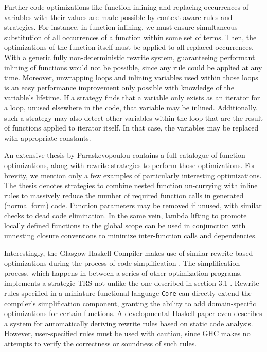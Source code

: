 \documentclass{article}
\begin{document}
Further code optimizations like function inlining and replacing occurrences of variables with their values
are made possible by context-aware rules and strategies. For instance, in function inlining, we must ensure
simultaneous substitution of all occurrences of a function within some set of terms.
Then, the optimizations of the function itself must be applied to all replaced occurrences.
With a generic fully non-deterministic rewrite system, guaranteeing performant inlining of functions would
not be possible, since any rule could be applied at any time. Moreover, unwrapping loops
and inlining variables used within those loops is an easy performance improvement only possible with knowledge of the variable's lifetime.
If a strategy finds that a variable only exists as an iterator for a loop, unused elsewhere in the code, that variable may be inlined.
Additionally, such a strategy may also detect other variables within the loop that are the result of functions applied to iterator itself.
In that case, the variables may be replaced with appropriate constants.

An extensive thesis by Paraskevopoulou \cite{paraskevopoulou2020verified} contains a full catalogue of function optimizations,
along with rewrite strategies to perform those optimizations.
For brevity, we mention only a few examples of particularly interesting optimizations.
The thesis denotes strategies to combine nested function un-currying with inline rules
to massively reduce the number of required function calls in generated (normal form) code.
Function parameters may be removed if unused, with similar checks to dead code elimination.
In the same vein, lambda lifting to promote locally defined functions to the global scope can be used in conjunction with unnesting closure conversions
to minimize inter-function calls and dependencies.

Interestingly, the Glasgow Haskell Compiler makes use of similar rewrite-based optimizations during the process of code simplification \cite{brown2011architecture}.
The simplification process, which happens in between a series of other optimization programs, implements a strategic TRS not unlike the one described in section 3.1 .
Rewrite rules specified in a miniature functional language \texttt{Core} can directly extend the compiler's simplification component,
granting the ability to add domain-specific optimizations for certain functions.
A developmental Haskell paper \cite{peytonjones2001playing} even describes a system for automatically deriving rewrite rules based on static code analysis.
However, user-specified rules must be used with caution,
since GHC makes no attempts to verify the correctness or soundness of such rules.
\end{document}
